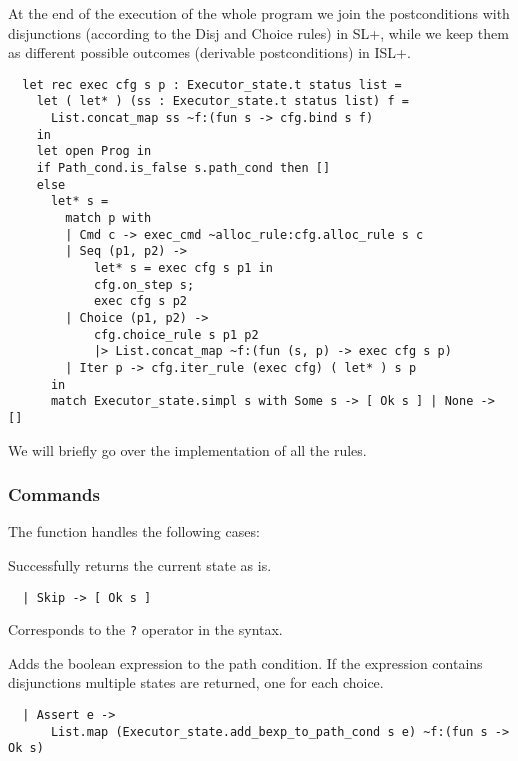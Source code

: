 \documentclass[parskip=half]{scrartcl}
\begin{document}
At the end of the execution of the whole program we join the postconditions with disjunctions (according to the Disj and Choice rules) in SL+, while we keep them as different possible outcomes (derivable postconditions) in ISL+.

\begin{verbatim}
  let rec exec cfg s p : Executor_state.t status list =
    let ( let* ) (ss : Executor_state.t status list) f =
      List.concat_map ss ~f:(fun s -> cfg.bind s f)
    in
    let open Prog in
    if Path_cond.is_false s.path_cond then []
    else
      let* s =
        match p with
        | Cmd c -> exec_cmd ~alloc_rule:cfg.alloc_rule s c
        | Seq (p1, p2) ->
            let* s = exec cfg s p1 in
            cfg.on_step s;
            exec cfg s p2
        | Choice (p1, p2) ->
            cfg.choice_rule s p1 p2
            |> List.concat_map ~f:(fun (s, p) -> exec cfg s p)
        | Iter p -> cfg.iter_rule (exec cfg) ( let* ) s p
      in
      match Executor_state.simpl s with Some s -> [ Ok s ] | None -> []
\end{verbatim}

We will briefly go over the implementation of all the rules.

\subsubsection{Commands}

The  function handles the following cases:


Successfully returns the current state as is.

\begin{verbatim}
  | Skip -> [ Ok s ]
\end{verbatim}


Corresponds to the \texttt{?} operator in the syntax.

Adds the boolean expression to the path condition. If the expression contains disjunctions multiple states are returned, one for each choice.

\begin{verbatim}
  | Assert e ->
      List.map (Executor_state.add_bexp_to_path_cond s e) ~f:(fun s -> Ok s)
\end{verbatim}

\end{document}
